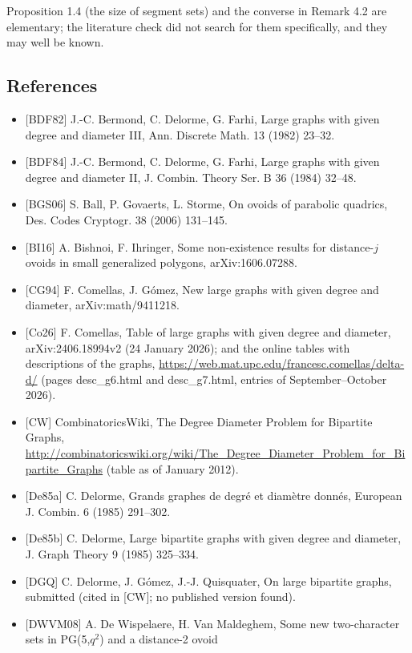 \documentclass[
  11pt,
]{article}
\providecommand{\tightlist}{%
  \setlength{\itemsep}{0pt}\setlength{\parskip}{0pt}}
\begin{document}
Proposition 1.4 (the size of segment sets) and the converse in Remark 4.2 are elementary; the literature check did not
search for them specifically, and they may well be known.

\hypertarget{references}{%
\subsection{References}\label{references}}

\begin{itemize}
\tightlist
\item
  {[}BDF82{]} J.-C. Bermond, C. Delorme, G. Farhi, Large graphs with given degree and diameter III, Ann. Discrete Math.
  13 (1982) 23--32.
\item
  {[}BDF84{]} J.-C. Bermond, C. Delorme, G. Farhi, Large graphs with given degree and diameter II, J. Combin. Theory
  Ser. B 36 (1984) 32--48.
\item
  {[}BGS06{]} S. Ball, P. Govaerts, L. Storme, On ovoids of parabolic quadrics, Des. Codes Cryptogr. 38 (2006) 131--145.
\item
  {[}BI16{]} A. Bishnoi, F. Ihringer, Some non-existence results for distance-\(j\) ovoids in small generalized
  polygons, arXiv:1606.07288.
\item
  {[}CG94{]} F. Comellas, J. Gómez, New large graphs with given degree and diameter, arXiv:math/9411218.
\item
  {[}Co26{]} F. Comellas, Table of large graphs with given degree and diameter, arXiv:2406.18994v2 (24 January 2026);
  and the online tables with descriptions of the graphs, \url{https://web.mat.upc.edu/francesc.comellas/delta-d/} (pages
  desc\_g6.html and desc\_g7.html, entries of September--October 2026).
\item
  {[}CW{]} CombinatoricsWiki, The Degree Diameter Problem for Bipartite Graphs,
  \url{http://combinatoricswiki.org/wiki/The_Degree_Diameter_Problem_for_Bipartite_Graphs} (table as of January 2012).
\item
  {[}De85a{]} C. Delorme, Grands graphes de degré et diamètre donnés, European J. Combin. 6 (1985) 291--302.
\item
  {[}De85b{]} C. Delorme, Large bipartite graphs with given degree and diameter, J. Graph Theory 9 (1985) 325--334.
\item
  {[}DGQ{]} C. Delorme, J. Gómez, J.-J. Quisquater, On large bipartite graphs, submitted (cited in {[}CW{]}; no
  published version found).
\item
  {[}DWVM08{]} A. De Wispelaere, H. Van Maldeghem, Some new two-character sets in PG(5,\(q^2\)) and a distance-2 ovoid

\end{itemize}
\end{document}

